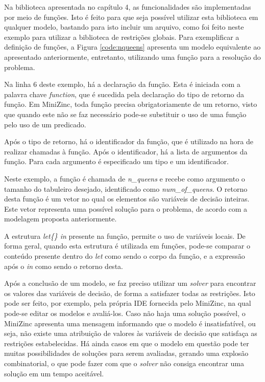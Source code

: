Na biblioteca apresentada no capítulo 4, as funcionalidades são implementadas por meio de funções. Isto é feito para que seja possível utilizar esta biblioteca em qualquer modelo, bastando para isto incluir um arquivo, como foi feito neste exemplo para utilizar a biblioteca de restrições globais. Para exemplificar a definição de funções, a Figura \ref{code:nqueens} apresenta um modelo equivalente ao apresentado anteriormente, entretanto, utilizando uma função para a resolução do problema.




Na linha 6 deste exemplo, há a declaração da função. Esta é iniciada com a palavra chave \textit{function}, que é sucedida pela declaração do tipo de retorno da função. Em MiniZinc, toda função precisa obrigatoriamente de um retorno, visto que quando este não se faz necessário pode-se substituir o uso de uma função pelo uso de um predicado.

Após o tipo de retorno, há o identificador da função, que é utilizado na hora de realizar chamadas à função. Após o identificador, há a lista de argumentos da função. Para cada argumento é especificado um tipo e um identificador.

Neste exemplo, a função é chamada de \textit{n\_queens} e recebe como argumento o tamanho do tabuleiro desejado, identificado como \textit{num\_of\_queens}. O retorno desta função é um vetor no qual os elementos são variáveis de decisão inteiras. Este vetor representa uma possível solução para o problema, de acordo com a modelagem proposta anteriormente.

A estrutura \textit{let\{\} in} presente na função, permite o uso de variáveis locais. De forma geral, quando esta estrutura é utilizada em funções, pode-se comparar o conteúdo presente dentro do \textit{let} como sendo o corpo da função, e a expressão após o \textit{in} como sendo o retorno desta.

Após a conclusão de um modelo, se faz preciso utilizar um \textit{solver} para encontrar os valores das variáveis de decisão, de forma a satisfazer todas as restrições. Isto pode ser feito, por exemplo, pela própria IDE fornecida pelo MiniZinc, na qual pode-se editar os modelos e avaliá-los. Caso não haja uma solução possível, o MiniZinc apresenta uma mensagem informando que o modelo é insatisfatível, ou seja, não existe uma atribuição de valores às variáveis de decisão que satisfaça as restrições estabelecidas. Há ainda casos em que o modelo em questão pode ter muitas possibilidades de soluções para serem avaliadas, gerando uma explosão combinatorial, o que pode fazer com que o \textit{solver} não consiga encontrar uma solução em um tempo aceitável.

